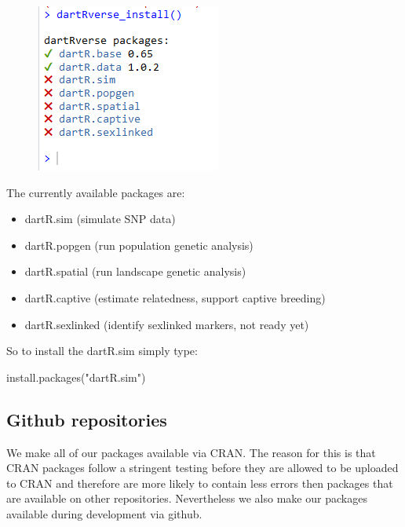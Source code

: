 \documentclass[
  letterpaper,
  DIV=11,
  numbers=noendperiod]{scrreprt}
\newenvironment{Shaded}{\begin{snugshade}}{\end{snugshade}}
\newcommand{\FunctionTok}[1]{\textcolor[rgb]{0.02,0.16,0.49}{#1}}
\newcommand{\NormalTok}[1]{\textcolor[rgb]{0.00,0.44,0.13}{#1}}
\newcommand{\StringTok}[1]{\textcolor[rgb]{0.25,0.44,0.63}{#1}}
\providecommand{\tightlist}{%
  \setlength{\itemsep}{0pt}\setlength{\parskip}{0pt}}\usepackage{longtable,booktabs,array}
\begin{document}
\begin{figure}

\includegraphics{images/dartRverse_install.png} \hfill{}

\end{figure}

The currently available packages are:

\begin{itemize}
\tightlist
\item
  dartR.sim (simulate SNP data)
\item
  dartR.popgen (run population genetic analysis)
\item
  dartR.spatial (run landscape genetic analysis)
\item
  dartR.captive (estimate relatedness, support captive breeding)
\item
  dartR.sexlinked (identify sexlinked markers, not ready yet)
\end{itemize}

So to install the dartR.sim simply type:

\begin{Shaded}
\begin{Highlighting}[]
\FunctionTok{install.packages}\NormalTok{(}\StringTok{"dartR.sim"}\NormalTok{)}
\end{Highlighting}
\end{Shaded}

\hypertarget{github-repositories}{%
\subsection*{Github repositories}\label{github-repositories}}

We make all of our packages available via CRAN. The reason for this is
that CRAN packages follow a stringent testing before they are allowed to
be uploaded to CRAN and therefore are more likely to contain less errors
then packages that are available on other repositories. Nevertheless we
also make our packages available during development via github.
\end{document}
